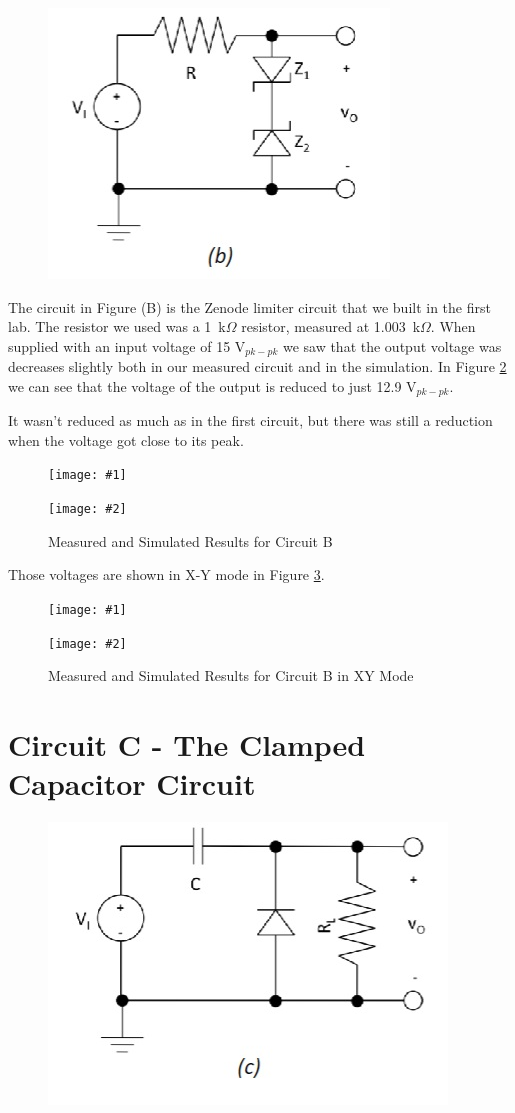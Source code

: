 \documentclass{article}
\newcommand{\twopics}[4]{
\begin{figure}
\begin{center}
  \begin{minipage}{.45\textwidth}
    \texttt{[image: \#1]}
  \end{minipage}
  \begin{minipage}{.45\textwidth}
    \texttt{[image: \#2]}
  \end{minipage}
  \label{#3}
  \caption{#4}
\end{center}
\end{figure}
}
\begin{document}
\begin{figure}[h!]
  \centering
  \includegraphics{imgs/circuits/circuitb.jpg}
  \label{circuitb}
\end{figure}

The circuit in Figure (B) is the Zenode limiter
circuit that we built in the first lab. The resistor
we used was a 1~k$\Omega$ resistor, measured at
1.003~k$\Omega$. When supplied with an input voltage
of 15 V$_{pk-pk}$ we saw that the output voltage 
was decreases slightly both in our measured circuit 
and in the simulation. In Figure \ref{circuitblinear} 
we can see that the voltage of the output is reduced
to just 12.9 V$_{pk-pk}$.

It wasn't reduced as much as in the first circuit,
but there was still a reduction when the voltage got 
close to its peak.

\twopics{imgs/scope/scope_CircuitB}{imgs/sim/Circuit B}{circuitblinear}{Measured and Simulated Results for Circuit B}

Those voltages are shown in X-Y mode in Figure \ref{circuitbxy}.

\twopics{imgs/scope/scope_CircuitB_XY}{imgs/sim/Circuit B X-Y}{circuitbxy}{Measured and Simulated Results for Circuit B in XY Mode}


\pagebreak

\section{Circuit C - The Clamped Capacitor Circuit}


\begin{figure}[h!]
  \centering
  \includegraphics{imgs/circuits/circuitc.jpg}
  \label{circuitc}
\end{figure}
\end{document}
